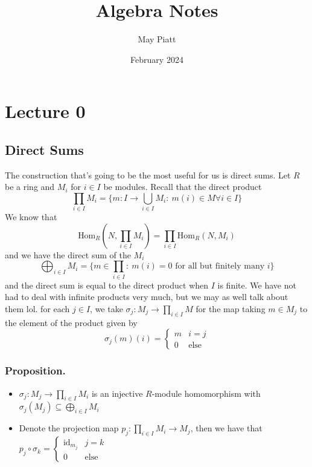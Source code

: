\documentclass{article}
\title{Algebra Notes}
\author{May Piatt}
\date{February 2024}
\begin{document}
\maketitle
\tableofcontents
\section{Lecture 0}
\subsection{Direct Sums} The construction that's going to be the most useful for
us is direct sums. Let $R$ be a ring and $M_i$ for $i \in I$ be modules. Recall
that the direct product
\[ \prod_{i\in I} M_i =\{ m: I \to \bigcup_{i\in I} M_i: \: m(i) \in M \forall
i\in I\}\]
We know that 
\[ \text{Hom}_R (N, \prod_{i\in I} M_i) = \prod_{i\in I} \text{Hom}_R(N, M_i)\]
and we have the direct sum of the $M_i$
\[ \bigoplus_{i\in I} M_i =\{ m\in \prod_{i\in I}:\: m(i) = 0\text{ for all but
finitely many $i$}\}\]
and the direct sum is equal to the direct product when $I$ is finite. We have
not had to deal with infinite products very much, but we may as well talk about
them lol. for each $j \in I$, we take $\sigma_j: M_j \to \prod_{i\in I}M$ for
the map taking $m \in M_j$ to the element of the product given by
\[\sigma_j(m)(i) = \begin{cases} m & i = j \\ 0 & \text{else}\end{cases}\]
\subsubsection{Proposition.}
\begin{itemize}
\item $\sigma_j: M_j \to \prod_{i\in I} M_i$ is an injective $R$-module
homomorphism with $\sigma_j(M_j) \subseteq \bigoplus_{i\in I}M_i$
\item Denote the projection map $p_j: \prod_{i\in I}M_i \to M_j$, then we have that
$p_j \circ \sigma_k = \begin{cases}\text{id}_{m_j} & j = k \\ 0 &
\text{else}\end{cases}$
\end{itemize}
\end{document}
